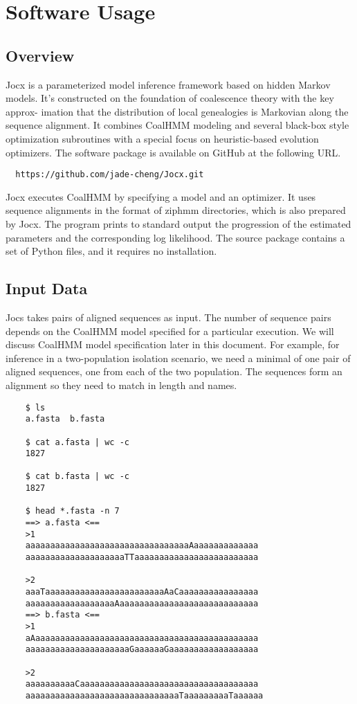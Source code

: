 \section{Software Usage}

\subsection{Overview}

Jocx is a parameterized model inference framework based on hidden Markov models.
It's constructed on the foundation of coalescence theory with the key approx-
imation that the distribution of local genealogies is Markovian along the
sequence alignment. It combines CoalHMM modeling and several black-box style
optimization subroutines with a special focus on heuristic-based evolution
optimizers. The software package is available on GitHub at the following URL.

{\small{}\begin{verbatim}
  https://github.com/jade-cheng/Jocx.git
\end{verbatim}}

Jocx executes CoalHMM by specifying a model and an optimizer. It uses sequence
alignments in the format of ziphmm directories, which is also prepared by Jocx.
The program prints to standard output the progression of the estimated
parameters and the corresponding log likelihood. The source package contains a
set of Python files, and it requires no installation.

\subsection{Input Data}

Jocs takes pairs of aligned sequences as input. The number of sequence pairs
depends on the CoalHMM model specified for a particular execution. We will
discuss CoalHMM model specification later in this document. For example, for
inference in a two-population isolation scenario, we need a minimal of one pair
of aligned sequences, one from each of the two population. The sequences form an
alignment so they need to match in length and names.

{\small{}\begin{verbatim}
    $ ls
    a.fasta  b.fasta

    $ cat a.fasta | wc -c
    1827

    $ cat b.fasta | wc -c
    1827

    $ head *.fasta -n 7
    ==> a.fasta <==
    >1
    aaaaaaaaaaaaaaaaaaaaaaaaaaaaaaaaaAaaaaaaaaaaaaa
    aaaaaaaaaaaaaaaaaaaaTTaaaaaaaaaaaaaaaaaaaaaaaaa

    >2
    aaaTaaaaaaaaaaaaaaaaaaaaaaaaAaCaaaaaaaaaaaaaaaa
    aaaaaaaaaaaaaaaaaaAaaaaaaaaaaaaaaaaaaaaaaaaaaaa
    ==> b.fasta <==
    >1
    aAaaaaaaaaaaaaaaaaaaaaaaaaaaaaaaaaaaaaaaaaaaaaa
    aaaaaaaaaaaaaaaaaaaaaGaaaaaaGaaaaaaaaaaaaaaaaaa

    >2
    aaaaaaaaaaCaaaaaaaaaaaaaaaaaaaaaaaaaaaaaaaaaaaa
    aaaaaaaaaaaaaaaaaaaaaaaaaaaaaaaTaaaaaaaaaTaaaaaa
\end{verbatim}}

